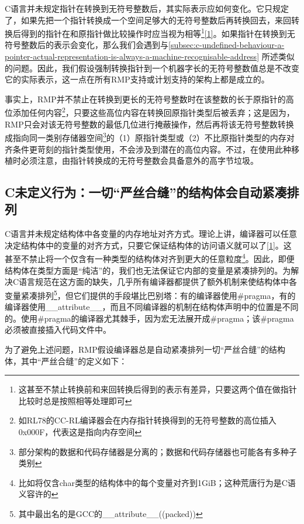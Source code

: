 C语言并未规定指针在转换到无符号整数后，其实际表示应如何变化。它只规定了，如果先把一个指针转换成一个空间足够大的无符号整数后再转换回去，来回转换后得到的指针在和原指针做比较操作时应当视为相等\footnote{这甚至不禁止转换前和来回转换后得到的表示有差异，只要这两个值在做指针比较时总是按照相等处理即可}\hyperref[sec:chapter-bibliography-11]{{[}1{]}}。如果指针在转换到无符号整数后的表示会变化，那么我们会遇到与\ref{subsec:c-undefined-behaviour-a-pointer-actual-representation-is-always-a-machine-recognisable-address}
所述类似的问题。因此，我们假设强制转换指针到一个机器字长的无符号整数值总是不改变它的实际表示，这一点在所有RMP支持或计划支持的架构上都是成立的。

事实上，RMP并不禁止在转换到更长的无符号整数时在该整数的长于原指针的高位添加任何内容\footnote{如RL78的CC-RL编译器会在内存指针转换得到的无符号整数的高位插入0x000F，代表这是指向内存空间}，只要这些高位内容在转换回原指针类型后被丢弃；这是因为，RMP只会对该无符号整数的最低几位进行掩蔽操作，然后再将该无符号整数转换成指向同一类别存储器空间\footnote{部分架构的数据和代码存储器是分离的；数据和代码存储器也可能各有多种子类别}的（1）原指针类型或（2）不比原指针类型的内存对齐条件更苛刻的指针类型使用，不会涉及到潜在的高位内容。不过，在使用此种移植时必须注意，由指针转换成的无符号整数会具备意外的高字节垃圾。

\subsection{C未定义行为：一切``严丝合缝''的结构体会自动紧凑排列}\label{subsec:c-undefined-behaviour-all-exactly-fitting-structures-are-automatically-packed}

C语言并未规定结构体中各变量的内存地址对齐方式。理论上讲，编译器可以任意决定结构体中的变量的对齐方式，只要它保证结构体的访问语义就可以了\hyperref[sec:chapter-bibliography-11]{{[}1{]}}。这甚至不禁止将一个仅含有一种类型的结构体对齐到更大的任意粒度\footnote{比如将仅含char类型的结构体中的每个变量对齐到1GiB；这种荒唐行为是C语义容许的}。因此，即便结构体在类型方面是``纯洁''的，我们也无法保证它内部的变量是紧凑排列的。为解决C语言规范在这方面的缺失，几乎所有编译器都提供了额外机制来使结构体中各变量紧凑排列\footnote{其中最出名的是GCC的\_\_attribute\_\_((packed))}，但它们提供的手段堪比巴别塔：有的编译器使用\#pragma，有的编译器使用\_\_attribute\_\_，而且不同编译器的机制在结构体声明中的位置是不同的。使用\#pragma的编译器尤其棘手，因为宏无法展开成\#pragma；该\#pragma必须被直接插入代码文件中。

为了避免上述问题，RMP假设编译器总是自动紧凑排列一切``严丝合缝''的结构体，其中``严丝合缝''的定义如下：

